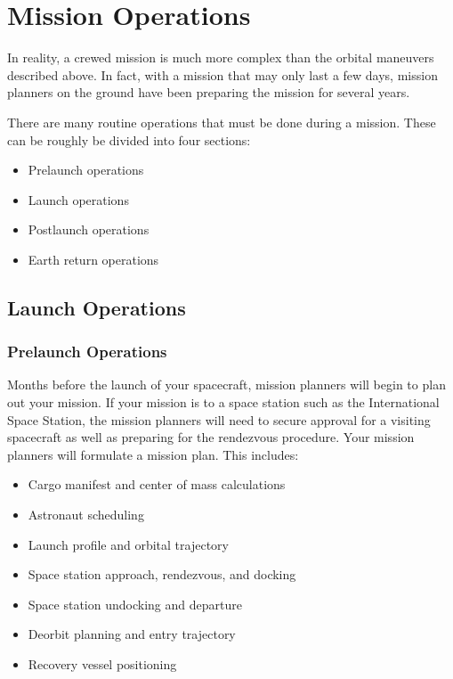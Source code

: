 
\chapter{Mission Operations}

\afterchapter

In reality, a crewed mission is much more complex than the orbital
maneuvers described above. In fact, with a mission that may only last
a few days, mission planners on the ground have been preparing the
mission for several years.

There are many routine operations that must be done during a
mission. These can be roughly be divided into four sections:

\begin{itemize}
\item Prelaunch operations
\item Launch operations
\item Postlaunch operations
\item Earth return operations
\end{itemize}

\section{Launch Operations}

\subsection{Prelaunch Operations}

Months before the launch of your spacecraft, mission planners will
begin to plan out your mission. If your mission is to a space station
such as the International Space Station, the mission planners will
need to secure approval for a visiting spacecraft as well as preparing
for the rendezvous procedure. Your mission planners will formulate a
mission plan. This includes:

\begin{itemize}
\item Cargo manifest and center of mass calculations
\item Astronaut scheduling
\item Launch profile and orbital trajectory
\item Space station approach, rendezvous, and docking
\item Space station undocking and departure
\item Deorbit planning and entry trajectory
\item Recovery vessel positioning
\end{itemize}

